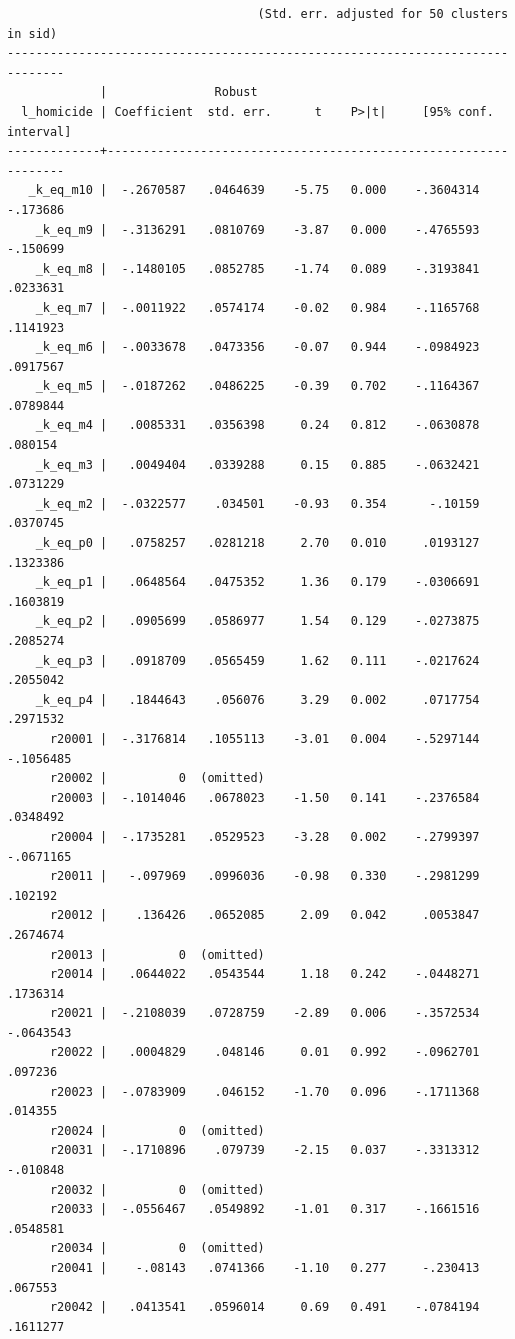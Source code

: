 \documentclass[
]{book}
\begin{document}
\begin{verbatim}
                                   (Std. err. adjusted for 50 clusters in sid)
------------------------------------------------------------------------------
             |               Robust
  l_homicide | Coefficient  std. err.      t    P>|t|     [95% conf. interval]
-------------+----------------------------------------------------------------
   _k_eq_m10 |  -.2670587   .0464639    -5.75   0.000    -.3604314    -.173686
    _k_eq_m9 |  -.3136291   .0810769    -3.87   0.000    -.4765593    -.150699
    _k_eq_m8 |  -.1480105   .0852785    -1.74   0.089    -.3193841    .0233631
    _k_eq_m7 |  -.0011922   .0574174    -0.02   0.984    -.1165768    .1141923
    _k_eq_m6 |  -.0033678   .0473356    -0.07   0.944    -.0984923    .0917567
    _k_eq_m5 |  -.0187262   .0486225    -0.39   0.702    -.1164367    .0789844
    _k_eq_m4 |   .0085331   .0356398     0.24   0.812    -.0630878     .080154
    _k_eq_m3 |   .0049404   .0339288     0.15   0.885    -.0632421    .0731229
    _k_eq_m2 |  -.0322577    .034501    -0.93   0.354      -.10159    .0370745
    _k_eq_p0 |   .0758257   .0281218     2.70   0.010     .0193127    .1323386
    _k_eq_p1 |   .0648564   .0475352     1.36   0.179    -.0306691    .1603819
    _k_eq_p2 |   .0905699   .0586977     1.54   0.129    -.0273875    .2085274
    _k_eq_p3 |   .0918709   .0565459     1.62   0.111    -.0217624    .2055042
    _k_eq_p4 |   .1844643    .056076     3.29   0.002     .0717754    .2971532
      r20001 |  -.3176814   .1055113    -3.01   0.004    -.5297144   -.1056485
      r20002 |          0  (omitted)
      r20003 |  -.1014046   .0678023    -1.50   0.141    -.2376584    .0348492
      r20004 |  -.1735281   .0529523    -3.28   0.002    -.2799397   -.0671165
      r20011 |   -.097969   .0996036    -0.98   0.330    -.2981299     .102192
      r20012 |    .136426   .0652085     2.09   0.042     .0053847    .2674674
      r20013 |          0  (omitted)
      r20014 |   .0644022   .0543544     1.18   0.242    -.0448271    .1736314
      r20021 |  -.2108039   .0728759    -2.89   0.006    -.3572534   -.0643543
      r20022 |   .0004829    .048146     0.01   0.992    -.0962701     .097236
      r20023 |  -.0783909    .046152    -1.70   0.096    -.1711368     .014355
      r20024 |          0  (omitted)
      r20031 |  -.1710896    .079739    -2.15   0.037    -.3313312    -.010848
      r20032 |          0  (omitted)
      r20033 |  -.0556467   .0549892    -1.01   0.317    -.1661516    .0548581
      r20034 |          0  (omitted)
      r20041 |    -.08143   .0741366    -1.10   0.277     -.230413     .067553
      r20042 |   .0413541   .0596014     0.69   0.491    -.0784194    .1611277

\end{verbatim}
\end{document}
